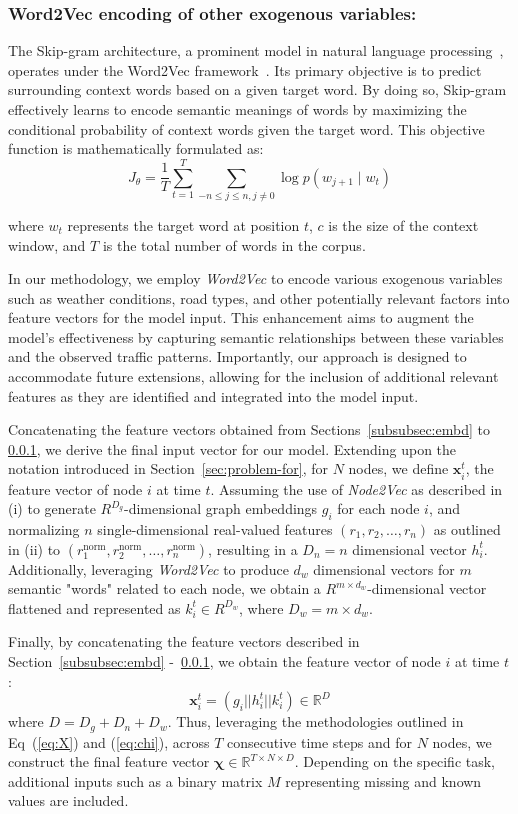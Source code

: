 \subsubsection{Word2Vec encoding of other exogenous variables:}\label{subsubsec:encode}
The Skip-gram architecture, a prominent model in natural language processing~\cite{skipgram}, operates under the Word2Vec framework~\cite{word2vec}. Its primary objective is to predict surrounding context words based on a given target word. By doing so, Skip-gram effectively learns to encode semantic meanings of words by maximizing the conditional probability of context words given the target word. This objective function is mathematically formulated as:
\[
J_\theta = \frac{1}{T}\sum^{T}_{t=1}\sum_{-n\leq j \leq n, j \neq 0}\log p\left(w_{j+1} \mid w_{t}\right)
\]

where \( w_t \) represents the target word at position \( t \), \( c \) is the size of the context window, and \( T \) is the total number of words in the corpus.

In our methodology, we employ \textit{Word2Vec} \cite{word2vec} to encode various exogenous variables such as weather conditions, road types, and other potentially relevant factors into feature vectors for the model input. This enhancement aims to augment the model's effectiveness by capturing semantic relationships between these variables and the observed traffic patterns. Importantly, our approach is designed to accommodate future extensions, allowing for the inclusion of additional relevant features as they are identified and integrated into the model input.

Concatenating the feature vectors obtained from Sections~\ref{subsubsec:embd} to \ref{subsubsec:encode}, we derive the final input vector for our model. Extending upon the notation introduced in Section~\ref{sec:problem-for}, for $N$ nodes, we define $\mathbf{x}_i^t$, the feature vector of node $i$ at time $t$. Assuming the use of \textit{Node2Vec} as described in (i) to generate $R^{D_g}$-dimensional graph embeddings $g_i$ for each node $i$, and normalizing $n$ single-dimensional real-valued features $(r_1, r_2, \ldots, r_n)$ as outlined in (ii) to $(r_1^{\text{norm}}, r_2^{\text{norm}}, \ldots, r_n^{\text{norm}})$, resulting in a $D_n = n$ dimensional vector $h_i^t$. Additionally, leveraging \textit{Word2Vec} to produce $d_w$ dimensional vectors for $m$ semantic "words" related to each node, we obtain a $R^{m \times d_w}$-dimensional vector flattened and represented as $k_i^t \in R^{D_w}$, where $D_w = m \times d_w$.

Finally, by concatenating the feature vectors described in Section~\ref{subsubsec:embd} -~\ref{subsubsec:encode}, we obtain the feature vector of node $i$ at time $t$:
\[
\mathbf{x}_i^t = ( g_i || h_i^t || k_i^t ) \in \mathbb{R}^D
\]
where $D = D_g + D_n + D_w$. Thus, leveraging the methodologies outlined in Eq~(\ref{eq:X}) and (\ref{eq:chi}), across $T$ consecutive time steps and for $N$ nodes, we construct the final feature vector $\mathbf{\chi} \in \mathbb{R}^{T \times N \times D}$. Depending on the specific task, additional inputs such as a binary matrix $M$ representing missing and known values are included. %
